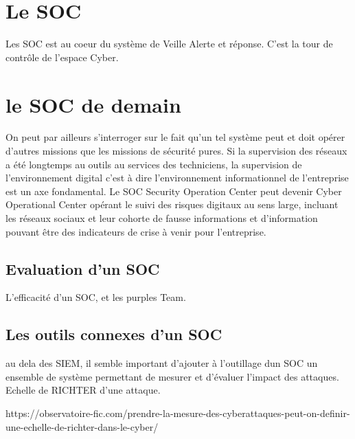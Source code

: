 
\section{Le SOC}

Les SOC est au coeur du système de Veille Alerte et réponse. C'est la tour de contrôle de l'espace Cyber.


\section{le SOC de demain}
On peut par ailleurs s'interroger sur le fait qu'un tel système peut et doit opérer d'autres missions que les missions de sécurité pures. Si la supervision des réseaux a été longtemps au outils au services des techniciens, la supervision de l'environnement digital c'est à dire l'environnement informationnel de l'entreprise est un axe fondamental. Le SOC Security Operation Center peut devenir Cyber Operational Center opérant le suivi des risques digitaux au sens large, incluant les réseaux sociaux et leur cohorte de fausse informations et d'information pouvant être des indicateurs de crise à venir pour l'entreprise.

\subsection{Evaluation d'un SOC}

L'efficacité d'un SOC, et les purples Team.




\subsection{Les outils connexes d'un SOC}

au dela des SIEM, il semble important d'ajouter à l'outillage dun SOC un ensemble de système permettant de mesurer et d'évaluer l'impact des attaques.
Echelle de RICHTER d'une attaque.

https://observatoire-fic.com/prendre-la-mesure-des-cyberattaques-peut-on-definir-une-echelle-de-richter-dans-le-cyber/